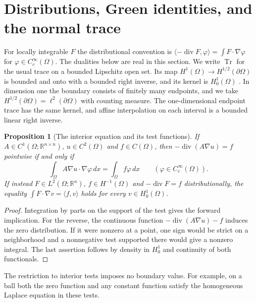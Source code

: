 \documentclass[11pt,oneside,openany]{book}
\DeclareMathOperator{\Div}{div}
\DeclareMathOperator{\Tr}{Tr}
\theoremstyle{plain}
\newtheorem{proposition}[theorem]{Proposition}
\theoremstyle{definition}
\theoremstyle{remark}
\begin{document}
\section{Distributions, Green identities, and the normal trace}
\label{pde:C02}

For locally integrable \(F\) the distributional convention is
\(\langle-\Div F,\varphi\rangle=\int F\cdot\nabla\varphi\) for
\(\varphi\in C_c^\infty(\Omega)\). The dualities below are real
in this section. We write \(\Tr\) for the usual trace on a bounded
Lipschitz open set. Its map \(H^1(\Omega)\to H^{1/2}(\partial\Omega)\)
is bounded and onto with a bounded right inverse, and its kernel
is \(H^1_0(\Omega)\) \cite[Unit U5]{P102}. In dimension one the
boundary consists of finitely many endpoints, and we take
\(H^{1/2}(\partial\Omega)=\ell^2(\partial\Omega)\) with counting
measure. The one-dimensional endpoint trace has the same kernel,
and affine interpolation on each interval is a bounded linear
right inverse.

\begin{proposition}[The interior equation and its test functions]
\label{prop:pde-interior-testing}
If \(A\in C^1(\Omega;\mathbb R^{n\times n})\),
\(u\in C^2(\Omega)\) and \(f\in C(\Omega)\), then
\(-\Div(A\nabla u)=f\) pointwise if and only if
\[
 \int_\Omega A\nabla u\cdot\nabla\varphi\,dx
     =\int_\Omega f\varphi\,dx\qquad(\varphi\in C_c^\infty(\Omega)).
\]
If instead \(F\in L^2(\Omega;\mathbb R^n)\), \(f\in H^{-1}(\Omega)\)
and \(-\Div F=f\) distributionally, the equality
\(\int F\cdot\nabla v=\langle f,v\rangle\) holds for every
\(v\in H^1_0(\Omega)\).
\end{proposition}
\begin{proof}
Integration by parts on the support of the test gives the forward
implication. For the reverse, the continuous function
\(-\Div(A\nabla u)-f\) induces the zero distribution.
If it were nonzero at a point, one sign would be strict on a
neighborhood and a nonnegative test supported there would give
a nonzero integral. The last assertion follows by density in
\(H^1_0\) and continuity of both functionals.
\end{proof}

The restriction to interior tests imposes no boundary value.
For example, on a ball both the zero function and any constant
function satisfy the homogeneous Laplace equation in these tests.
\end{document}
